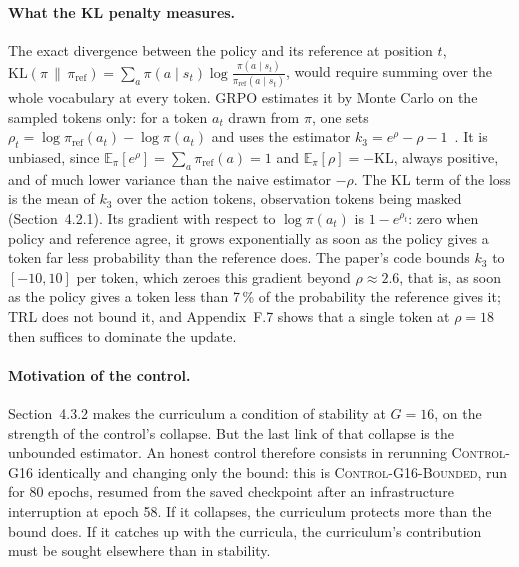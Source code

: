 \documentclass[11pt,a4paper]{article}
\begin{document}
\paragraph{What the KL penalty measures.} The exact divergence between the policy and its reference at position $t$, $\mathrm{KL}(\pi \,\|\, \pi_{\mathrm{ref}}) = \sum_{a} \pi(a \mid s_t) \log \frac{\pi(a \mid s_t)}{\pi_{\mathrm{ref}}(a \mid s_t)}$, would require summing over the whole vocabulary at every token. GRPO estimates it by Monte Carlo on the sampled tokens only: for a token $a_t$ drawn from $\pi$, one sets $\rho_t = \log \pi_{\mathrm{ref}}(a_t) - \log \pi(a_t)$ and uses the estimator $k_3 = e^{\rho} - \rho - 1$~\cite{schulman2020kl}. It is unbiased, since $\mathbb{E}_{\pi}[e^{\rho}] = \sum_a \pi_{\mathrm{ref}}(a) = 1$ and $\mathbb{E}_{\pi}[\rho] = -\mathrm{KL}$, always positive, and of much lower variance than the naive estimator $-\rho$. The KL term of the loss is the mean of $k_3$ over the action tokens, observation tokens being masked (Section~4.2.1). Its gradient with respect to $\log \pi(a_t)$ is $1 - e^{\rho_t}$: zero when policy and reference agree, it grows exponentially as soon as the policy gives a token far less probability than the reference does. The paper's code bounds $k_3$ to $[-10, 10]$ per token, which zeroes this gradient beyond $\rho \approx 2.6$, that is, as soon as the policy gives a token less than 7\,\% of the probability the reference gives it; TRL does not bound it, and Appendix~F.7 shows that a single token at $\rho = 18$ then suffices to dominate the update.

\paragraph{Motivation of the control.} Section~4.3.2 makes the curriculum a condition of stability at $G=16$, on the strength of the control's collapse. But the last link of that collapse is the unbounded estimator. An honest control therefore consists in rerunning \textsc{Control-G16} identically and changing only the bound: this is \textsc{Control-G16-Bounded}, run for 80 epochs, resumed from the saved checkpoint after an infrastructure interruption at epoch 58. If it collapses, the curriculum protects more than the bound does. If it catches up with the curricula, the curriculum's contribution must be sought elsewhere than in stability.
\end{document}
